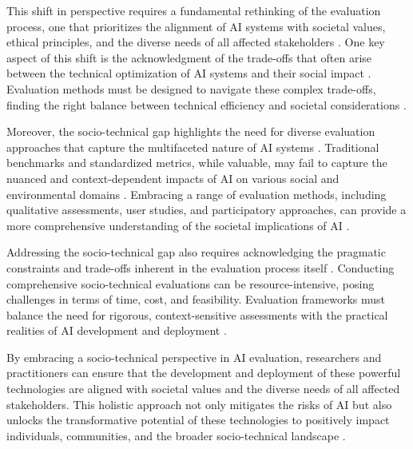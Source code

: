 \documentclass[11pt]{article}
\begin{document}
This shift in perspective requires a fundamental rethinking of the evaluation process, one that prioritizes the alignment of AI systems with societal values, ethical principles, and the diverse needs of all affected stakeholders \cite{ref359,ref360}. One key aspect of this shift is the acknowledgment of the trade-offs that often arise between the technical optimization of AI systems and their social impact \cite{ref361}. Evaluation methods must be designed to navigate these complex trade-offs, finding the right balance between technical efficiency and societal considerations \cite{ref355}.

Moreover, the socio-technical gap highlights the need for diverse evaluation approaches that capture the multifaceted nature of AI systems \cite{ref362}. Traditional benchmarks and standardized metrics, while valuable, may fail to capture the nuanced and context-dependent impacts of AI on various social and environmental domains \cite{ref363}. Embracing a range of evaluation methods, including qualitative assessments, user studies, and participatory approaches, can provide a more comprehensive understanding of the societal implications of AI \cite{ref364}.

Addressing the socio-technical gap also requires acknowledging the pragmatic constraints and trade-offs inherent in the evaluation process itself \cite{ref365}. Conducting comprehensive socio-technical evaluations can be resource-intensive, posing challenges in terms of time, cost, and feasibility. Evaluation frameworks must balance the need for rigorous, context-sensitive assessments with the practical realities of AI development and deployment \cite{ref366}.

By embracing a socio-technical perspective in AI evaluation, researchers and practitioners can ensure that the development and deployment of these powerful technologies are aligned with societal values and the diverse needs of all affected stakeholders. This holistic approach not only mitigates the risks of AI but also unlocks the transformative potential of these technologies to positively impact individuals, communities, and the broader socio-technical landscape \cite{ref367,ref368}.
\end{document}
